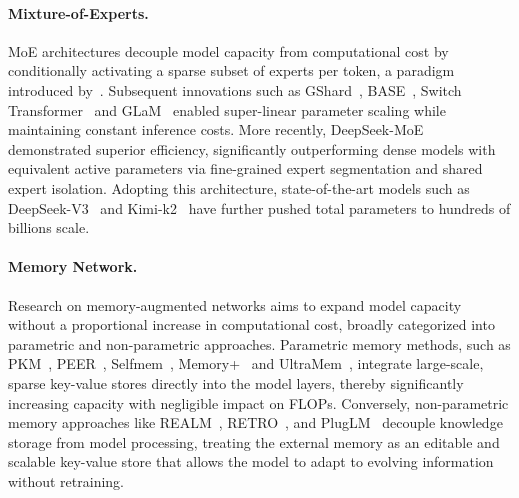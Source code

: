 \paragraph{Mixture-of-Experts.} MoE architectures decouple model capacity from computational cost by conditionally activating a sparse subset of experts per token, a paradigm introduced by~\citet{shazeer2017outrageously}. Subsequent innovations such as GShard~\citep{lepikhin2020gshard}, BASE~\citep{pmlr-v139-lewis21a}, Switch Transformer~\citep{fedus2022switch} and GLaM~\citep{du2022glam} enabled super-linear parameter scaling while maintaining constant inference costs. More recently, DeepSeek-MoE~\citep{dai2024deepseekmoe} demonstrated superior efficiency, significantly outperforming dense models with equivalent active parameters via fine-grained expert segmentation and shared expert isolation. Adopting this architecture, state-of-the-art models such as DeepSeek-V3~\citep{liu2024deepseek} and Kimi-k2~\citep{team2025kimi} have further pushed total parameters to hundreds of billions scale.
 
\paragraph{Memory Network.}
Research on memory-augmented networks aims to expand model capacity without a proportional increase in computational cost, broadly categorized into parametric and non-parametric approaches. Parametric memory methods, such as PKM~\citep{lample2019large}, PEER~\citep{he2024mixture}, Selfmem~\citep{cheng2023lift}, Memory+~\citep{berges2024memory} and UltraMem~\citep{huang2024ultra,huang2025ultramemv2}, integrate large-scale, sparse key-value stores directly into the model layers, thereby significantly increasing capacity with negligible impact on FLOPs. 
Conversely, non-parametric memory approaches like REALM~\citep{guu2020retrieval}, RETRO~\citep{borgeaud2022improving,wang2023shall}, and PlugLM~\citep{cheng2023decouple} decouple knowledge storage from model processing, treating the external memory as an editable and scalable key-value store that allows the model to adapt to evolving information without retraining.

